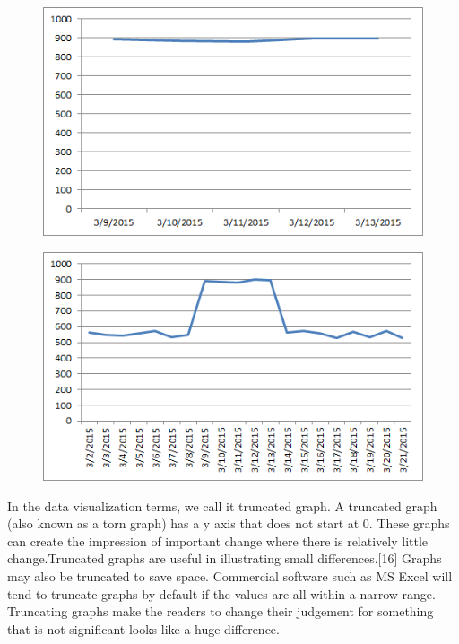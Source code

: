 \documentclass[]{book}
\theoremstyle{definition}
\theoremstyle{definition}
\theoremstyle{definition}
\theoremstyle{remark}
\begin{document}
\begin{figure}
\centering
\includegraphics{images/Bad_graph_extraction.png}
\caption{}
\end{figure}

\begin{figure}
\centering
\includegraphics{images/Good_graph_extraction.png}
\caption{}
\end{figure}

In the data visualization terms, we call it truncated graph. A truncated
graph (also known as a torn graph) has a y axis that does not start at
0. These graphs can create the impression of important change where
there is relatively little change.Truncated graphs are useful in
illustrating small differences.{[}16{]} Graphs may also be truncated to
save space. Commercial software such as MS Excel will tend to truncate
graphs by default if the values are all within a narrow range.
Truncating graphs make the readers to change their judgement for
something that is not significant looks like a huge difference.
\end{document}
